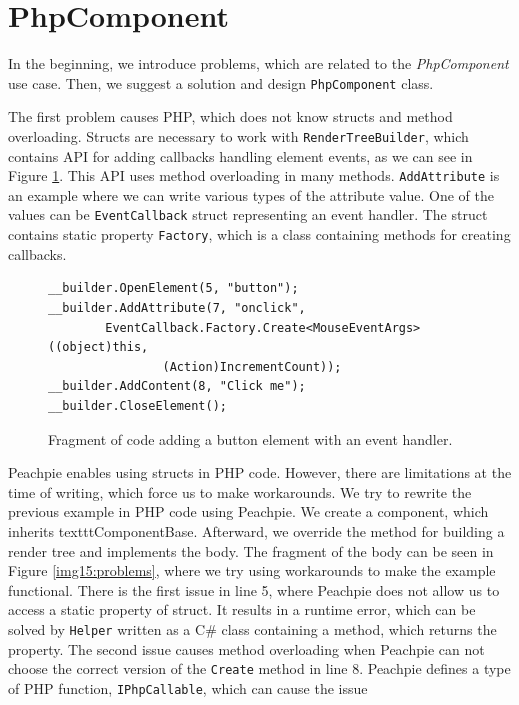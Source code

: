 \section{PhpComponent}

In the beginning, we introduce problems, which are related to the \textit{PhpComponent} use case.
Then, we suggest a solution and design \texttt{PhpComponent} class.
\par
The first problem causes PHP, which does not know structs and method overloading.
Structs are necessary to work with \texttt{RenderTreeBuilder}, which contains API for adding callbacks handling element events, as we can see in Figure \ref{img14:callback}.
This API uses method overloading in many methods.
\texttt{AddAttribute} is an example where we can write various types of the attribute value.
One of the values can be \texttt{EventCallback} struct representing an event handler.
The struct contains static property \texttt{Factory}, which is a class containing methods for creating callbacks.
\par
\begin{figure}
\begin{lstlisting}
__builder.OpenElement(5, "button");
__builder.AddAttribute(7, "onclick", 
		EventCallback.Factory.Create<MouseEventArgs>((object)this, 
				(Action)IncrementCount));
__builder.AddContent(8, "Click me");
__builder.CloseElement();
\end{lstlisting}
\caption{Fragment of code adding a button element with an event handler.}
\label{img14:callback}
\end{figure}
\par
Peachpie enables using structs in PHP code. 
However, there are limitations at the time of writing, which force us to make workarounds.
We try to rewrite the previous example in PHP code using Peachpie.
We create a component, which inherits {textttComponentBase}. 
Afterward, we override the method for building a render tree and implements the body.
The fragment of the body can be seen in Figure \ref{img15:problems}, where we try using workarounds to make the example functional.
There is the first issue in line 5, where Peachpie does not allow us to access a static property of struct.
It results in a runtime error, which can be solved by \texttt{Helper} written as a C\# class containing a method, which returns the property.
The second issue causes method overloading when Peachpie can not choose the correct version of the \texttt{Create} method in line 8.
Peachpie defines a type of PHP function, \texttt{IPhpCallable}, which can cause the issue
